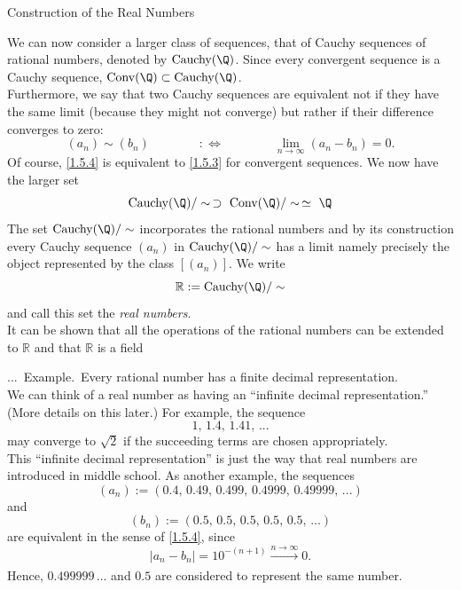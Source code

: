 \documentclass[smaller,hyperref={CJKbookmarks=true}]{beamer}
\newcommand{\R}{\mathbb{R}}
\newcounter{zhuo}[subsection]
\renewcommand{\thezhuo}{\thesection.\thesubsection.\arabic{zhuo}}
\newenvironment{EXAMPLE}{\stepcounter{zhuo}\alert{\!\thezhuo.~Example.\,}}{}
\begin{document}
\begin{frame}{Construction of the Real Numbers}
\begin{spacing}{1.1}
We can now consider a larger class of sequences, that of Cauchy sequences
of rational numbers, denoted by $\text{Cauchy}(\Q)$. Since every convergent sequence is a Cauchy sequence, $\text{Conv}(\Q)\subset\text{Cauchy}(\Q)$.\\[5pt]
Furthermore, we say that two Cauchy sequences are equivalent not if they
have the same limit (because they might not converge) but rather if their
difference converges to zero:
\begin{equation}\label{1.5.4}
  (a_n)\sim(b_n)\qquad\qquad:\Leftrightarrow
  \qquad\qquad\lim_{n\to\infty}(a_n-b_n)=0.
\end{equation}
Of course, \eqref{1.5.4} is equivalent to \eqref{1.5.3} for convergent sequences. We now have the larger set
\[\text{Cauchy}(\Q)/\sim\,\supset~\text{Conv}(\Q)/\sim
\,\simeq~\Q\]
\newpage
\vspace*{10pt}
The set $\text{Cauchy}(\Q)/\sim$ incorporates the rational numbers and by its construction every Cauchy sequence $(a_n)$ in $\text{Cauchy}(\Q)/\sim$ has a limit namely precisely the object represented by the class $[(a_n)]$. We write
\[\R:=\text{Cauchy}(\Q)/\sim\]
and call this set the \emph{real numbers}.\\[5pt]
It can be shown that all the operations of the rational numbers can be
extended to $\R$ and that $\R$ is a field
\end{spacing}
\newpage
\begin{spacing}{0.85}
\begin{EXAMPLE}
Every rational number has a finite decimal representation.\\
We can think of a real number as having an ``infinite decimal representation.'' (More details on this later.) For example, the sequence
\[1,\,1.4,\,1.41,\,...\]
may converge to $\sqrt{2}$ if the succeeding terms are chosen appropriately.\\[5pt]
This ``infinite decimal representation'' is just the way that real numbers are
introduced in middle school. As another example, the sequences
\[(a_n):=(0.4,\,0.49,\,0.499,\,0.4999,\,
0.49999,\,...)\]
and
\[(b_n):=(0.5,\,0.5,\,0.5,\,0.5,\,0.5,\,...)\]
are equivalent in the sense of \eqref{1.5.4}, since
\[|a_n-b_n|=10^{-(n+1)}\xrightarrow[]{n\to\infty}0.\]
Hence, $0.499999\,...$ and $0.5$ are considered to represent the same number.
\end{EXAMPLE}
\end{spacing}
\end{frame}
\end{document}
